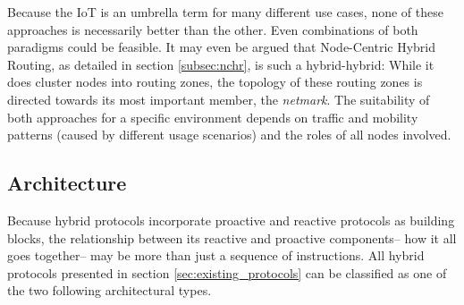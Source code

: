\documentclass[a4paper,10pt]{scrartcl}
\begin{document}
Because the IoT is an umbrella term for many different use cases, none of these approaches is necessarily better than the other. Even combinations of both paradigms could be feasible. It may even be argued that Node-Centric Hybrid Routing, as detailed in section \ref{subsec:nchr}, is such a hybrid-hybrid: While it does cluster nodes into routing zones, the topology of these routing zones is directed towards its most important member, the \emph{netmark}. The suitability of both approaches for a specific environment depends on traffic and mobility patterns (caused by different usage scenarios) and the roles of all nodes involved.

\subsection{Architecture}
\label{subsec:architecture}
Because hybrid protocols incorporate proactive and reactive protocols as building blocks, the relationship between its reactive and proactive components-- how it all goes together-- may be more than just a sequence of instructions. All hybrid protocols presented in section \ref{sec:existing_protocols} can be classified as one of the two following architectural types.
\end{document}
